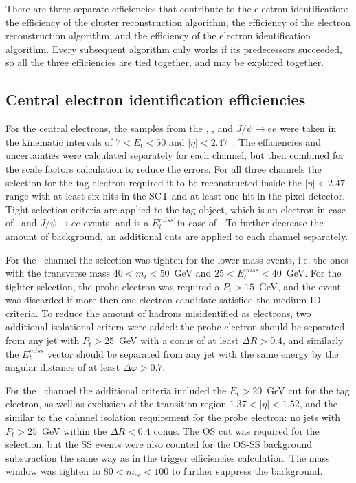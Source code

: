 There are three separate efficiencies that contribute to the electron identification: the efficiency of the cluster reconstruction algorithm, the efficiency of the electron reconstruction algorithm, and the efficiency of the electron identification algorithm. Every subsequent algorithm only works if its predecessors succeeded, so all the three efficiencies are tied together, and may be explored together.

\subsection{Central electron identification efficiencies}

For the central electrons, the samples from the \Zee, \Wenu, and $J/\psi \to ee$ were taken in the kinematic intervals of $7 < E_{t} < 50$ and $|\eta| < 2.47$~\cite{lib:elec_reco}. The efficiencies and uncertainties were calculated separately for each channel, but then combined for the scale factors calculation to reduce the errors. For all three channels the selection for the tag electron required it to be reconstructed inside the $|\eta| < 2.47$ range with at least six hits in the SCT and at least one hit in the pixel detector. Tight selection criteria are applied to the tag object, which is an electron in case of \Zee\ and $J/\psi \to ee$ events, and is a $E_{t}^{miss}$ in case of \Wenu. To further decrease the amount of background, an additional cuts are applied to each channel separately.

For the \Wenu\ channel the selection was tighten for the lower-mass events, i.e. the ones with the transverse mass $40 < m_{t} < 50$~GeV and $25 < E_{t}^{miss} < 40$~GeV. For the tighter selection, the probe electron was required a $P_{t} > 15$~GeV, and the event was discarded if more then one electron candidate satisfied the medium ID criteria. To reduce the amount of hadrons misidentified as electrons, two additional isolational critera were added: the probe electron should be separated from any jet with $P_{t} > 25$~GeV with a conus of at least $\Delta R > 0.4$, and similarly the $E_{t}^{miss}$ vector should be separated from any jet with the same energy by the angular distance of at least $\Delta \varphi > 0.7$.

For the \Zee\ channel the additional criteria included the $E_{t} > 20$~GeV cut for the tag electron, as well as exclusion of the transition region $1.37 < |\eta| < 1.52$, and the similar to the \Wenu cahnnel isolation requirement for the probe electron: no jets with $P_{t} > 25$~GeV within the $\Delta R < 0.4$ conus. The OS cut was required for the selection, but the SS events were also counted for the OS-SS background substraction the same way as in the trigger efficiencies calculation. The mass window was tighten to $80 < m_{ee} < 100$ to further suppress the background.

